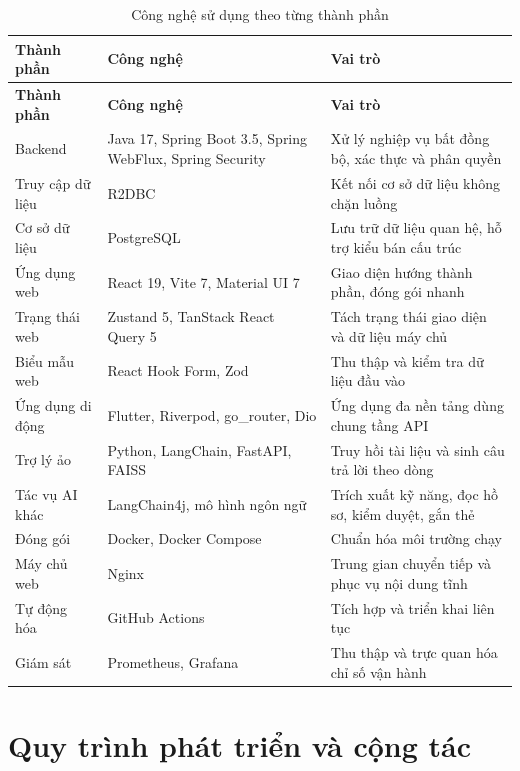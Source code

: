\documentclass[12pt,a4paper,oneside]{report}
\begin{document}
\renewcommand{\arraystretch}{1.2}
\begin{longtable}{|>{\raggedright\arraybackslash}p{2.9cm}|>{\raggedright\arraybackslash}p{5.0cm}|>{\raggedright\arraybackslash}p{6.6cm}|}
\caption{Công nghệ sử dụng theo từng thành phần}\label{tab:tech}\\
\hline \textbf{Thành phần} & \textbf{Công nghệ} & \textbf{Vai trò} \\ \hline
\endfirsthead
\hline \textbf{Thành phần} & \textbf{Công nghệ} & \textbf{Vai trò} \\ \hline
\endhead
Backend & Java 17, Spring Boot 3.5, Spring WebFlux, Spring Security & Xử lý nghiệp vụ bất đồng bộ, xác thực và phân quyền \\ \hline
Truy cập dữ liệu & R2DBC & Kết nối cơ sở dữ liệu không chặn luồng \\ \hline
Cơ sở dữ liệu & PostgreSQL & Lưu trữ dữ liệu quan hệ, hỗ trợ kiểu bán cấu trúc \\ \hline
Ứng dụng web & React 19, Vite 7, Material UI 7 & Giao diện hướng thành phần, đóng gói nhanh \\ \hline
Trạng thái web & Zustand 5, TanStack React Query 5 & Tách trạng thái giao diện và dữ liệu máy chủ \\ \hline
Biểu mẫu web & React Hook Form, Zod & Thu thập và kiểm tra dữ liệu đầu vào \\ \hline
Ứng dụng di động & Flutter, Riverpod, go\_router, Dio & Ứng dụng đa nền tảng dùng chung tầng API \\ \hline
Trợ lý ảo & Python, LangChain, FastAPI, FAISS & Truy hồi tài liệu và sinh câu trả lời theo dòng \\ \hline
Tác vụ AI khác & LangChain4j, mô hình ngôn ngữ & Trích xuất kỹ năng, đọc hồ sơ, kiểm duyệt, gắn thẻ \\ \hline
Đóng gói & Docker, Docker Compose & Chuẩn hóa môi trường chạy \\ \hline
Máy chủ web & Nginx & Trung gian chuyển tiếp và phục vụ nội dung tĩnh \\ \hline
Tự động hóa & GitHub Actions & Tích hợp và triển khai liên tục \\ \hline
Giám sát & Prometheus, Grafana & Thu thập và trực quan hóa chỉ số vận hành \\ \hline
\end{longtable}
\renewcommand{\arraystretch}{1}

\section{Quy trình phát triển và cộng tác}
\end{document}
